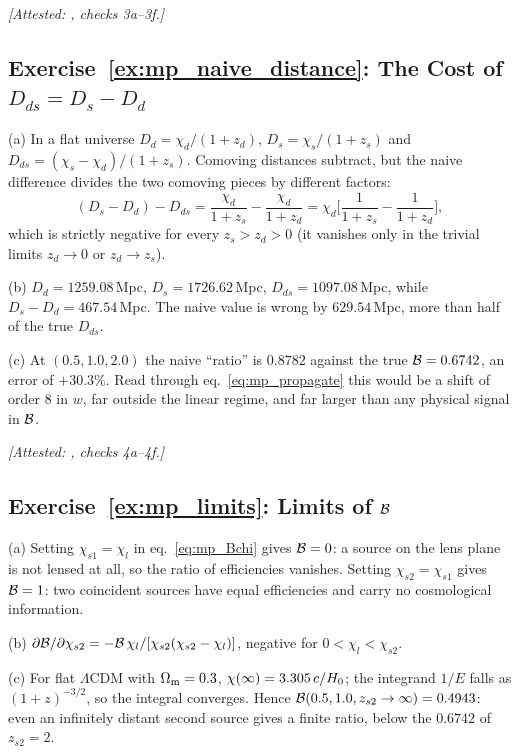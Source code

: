 \emph{[Attested: ,
checks 3a--3f.]}

\subsection*{Exercise~\ref{ex:mp_naive_distance}: The Cost of $D_{ds}=D_s-D_d$}

(a) In a flat universe
$D_d=\chi_d/(1+z_d)$, $D_s=\chi_s/(1+z_s)$ and
$D_{ds}=(\chi_s-\chi_d)/(1+z_s)$.  Comoving distances subtract, but the
naive difference divides the two comoving pieces by different factors:
\begin{equation*}
  (D_s-D_d)-D_{ds}=\frac{\chi_d}{1+z_s}-\frac{\chi_d}{1+z_d}
  =\chi_d\Big[\frac{1}{1+z_s}-\frac{1}{1+z_d}\Big],
\end{equation*}
which is strictly negative for every $z_s>z_d>0$ (it vanishes only in the
trivial limits $z_d\to0$ or $z_d\to z_s$).

(b) $D_d=1259.08$\,Mpc, $D_s=1726.62$\,Mpc, $D_{ds}=1097.08$\,Mpc,
while $D_s-D_d=467.54$\,Mpc.  The naive value is wrong by $629.54$\,Mpc,
more than half of the true $D_{ds}$.

(c) At $(0.5,1.0,2.0)$ the naive ``ratio'' is $0.8782$ against
the true $\mathcal{B}=0.6742$, an error of $+30.3\%$.  Read through
eq.~\eqref{eq:mp_propagate} this would be a shift of order $8$ in $w$,
far outside the linear regime, and far larger than any physical signal
in $\mathcal{B}$.

\emph{[Attested: ,
checks 4a--4f.]}

\subsection*{Exercise~\ref{ex:mp_limits}: Limits of $\mathcal{B}$}

(a) Setting $\chi_{s1}=\chi_l$ in eq.~\eqref{eq:mp_Bchi} gives
$\mathcal{B}=0$: a source on the lens plane is not lensed at all, so the ratio
of efficiencies vanishes.  Setting $\chi_{s2}=\chi_{s1}$ gives $\mathcal{B}=1$:
two coincident sources have equal efficiencies and carry no
cosmological information.

(b)
$\partial\mathcal{B}/\partial\chi_{s2}=-\mathcal{B}\,\chi_l/[\chi_{s2}(\chi_{s2}-\chi_l)]$,
negative for $0<\chi_l<\chi_{s2}$.

(c) For flat $\Lambda$CDM with $\Omega_{\mathrm{m}}=0.3$,
$\chi(\infty)=3.305\,c/H_0$; the integrand $1/E$ falls as
$(1+z)^{-3/2}$, so the integral converges.  Hence
$\mathcal{B}(0.5,1.0,z_{s2}\to\infty)=0.4943$: even an infinitely distant
second source gives a finite ratio, below the $0.6742$ of
$z_{s2}=2$.

